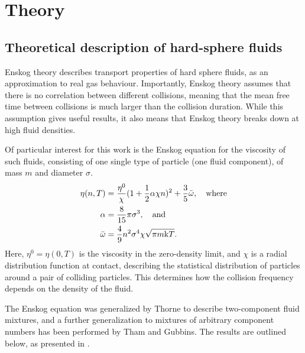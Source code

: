 \section{Theory}
\label{sec:theory}
\subsection{Theoretical description of hard-sphere fluids}
%
Enskog theory describes transport properties of hard sphere fluids, as an approximation to real gas behaviour.
Importantly, Enskog theory assumes that there is no correlation between different collisions, 
meaning that the mean free time between collisions is much larger than the collision duration.
While this assumption gives useful results, it also means that Enskog theory breaks down at high fluid densities.

Of particular interest for this work is the Enskog equation for the viscosity of such fluids,
consisting of one single type of particle (one fluid component), of mass $m$ and diameter $\sigma$.
\begin{equation}
    \begin{split}
        \eta(n,T) 
            &= \frac{\eta^0}{\chi} (1+\frac{1}{2} \alpha \chi n)^2 + \frac{3}{5} \bar{\omega}, \quad \text{where}\\
        \alpha 
            &= \frac{8}{15} \pi \sigma^3, \quad \text{and} \\
        \bar{\omega} 
            &= \frac{4}{9} n^2 \sigma^4 \chi \sqrt{\pi m \mathrm{k} T}.
    \end{split}
\end{equation}
Here, $\eta^0 = \eta(0, T)$ is the viscosity in the zero-density limit, 
and $\chi$ is a radial distribution function at contact, 
describing the statistical distribution of particles around a pair of colliding particles.
This determines how the collision frequency depends on the density of the fluid.

The Enskog equation was generalized by Thorne to describe two-component 
fluid mixtures\cite{ref:chapman:non_uniform_gases}, and a further 
generalization to mixtures of arbitrary component numbers has been 
performed by Tham and Gubbins\cite{ref:tham:fluid_mixtures}.
The results are outlined below, as presented in \cite{ref:pippo:composition_dependence}.

